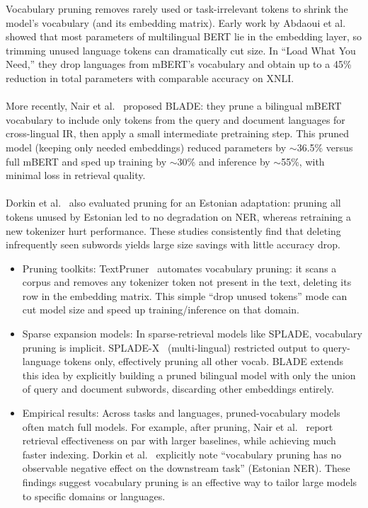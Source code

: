 \documentclass[twocolumn]{article}
\begin{document}
Vocabulary pruning removes rarely used or task-irrelevant tokens to shrink the model's vocabulary (and its embedding matrix). Early work by Abdaoui et al.~\cite{abdaoui2020load} showed that most parameters of multilingual BERT lie in the embedding layer, so trimming unused language tokens can dramatically cut size. In ``Load What You Need,'' they drop languages from mBERT's vocabulary and obtain up to a 45\% reduction in total parameters with comparable accuracy on XNLI.
\\
\\
More recently, Nair et al.~\cite{nair2023blade} proposed BLADE: they prune a bilingual mBERT vocabulary to include only tokens from the query and document languages for cross-lingual IR, then apply a small intermediate pretraining step. This pruned model (keeping only needed embeddings) reduced parameters by $\sim$36.5\% versus full mBERT and sped up training by $\sim$30\% and inference by $\sim$55\%, with minimal loss in retrieval quality. 
\\
\\
Dorkin et al.~\cite{dorkin2025estonian} also evaluated pruning for an Estonian adaptation: pruning all tokens unused by Estonian led to no degradation on NER, whereas retraining a new tokenizer hurt performance. These studies consistently find that deleting infrequently seen subwords yields large size savings with little accuracy drop.

\begin{itemize}
    \item Pruning toolkits: TextPruner~\cite{shen2022textpruner} automates vocabulary pruning: it scans a corpus and removes any tokenizer token not present in the text, deleting its row in the embedding matrix. This simple ``drop unused tokens'' mode can cut model size and speed up training/inference on that domain.
    \item Sparse expansion models: In sparse-retrieval models like SPLADE, vocabulary pruning is implicit. SPLADE-X~\cite{formal2023spladex} (multi-lingual) restricted output to query-language tokens only, effectively pruning all other vocab. BLADE extends this idea by explicitly building a pruned bilingual model with only the union of query and document subwords, discarding other embeddings entirely.
    \item Empirical results: Across tasks and languages, pruned-vocabulary models often match full models. For example, after pruning, Nair et al.~\cite{nair2023blade} report retrieval effectiveness on par with larger baselines, while achieving much faster indexing. Dorkin et al.~\cite{dorkin2025estonian} explicitly note ``vocabulary pruning has no observable negative effect on the downstream task'' (Estonian NER). These findings suggest vocabulary pruning is an effective way to tailor large models to specific domains or languages.
\end{itemize}
\end{document}
